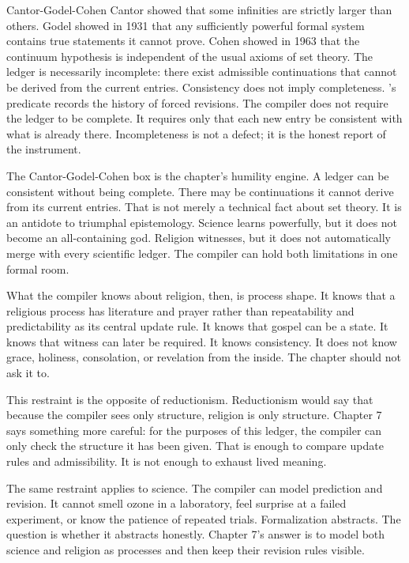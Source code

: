 \begin{gphenom}{Cantor-Godel-Cohen}
\label{ph:cantor-godel-cohen}
\GPhObs Cantor showed that some infinities are strictly larger than others.
Godel showed in 1931 that any sufficiently powerful formal system contains
true statements it cannot prove. Cohen showed in 1963 that the continuum
hypothesis is independent of the usual axioms of set theory.
\GPhCon The ledger is necessarily incomplete: there exist admissible
continuations that cannot be derived from the current entries. Consistency does
not imply completeness.
\GPhSeq {}'s  predicate records the history of forced
revisions. The compiler does not require the ledger to be complete. It requires
only that each new entry be consistent with what is already there.
Incompleteness is not a defect; it is the honest report of the instrument.
\end{gphenom}

The Cantor-Godel-Cohen box is the chapter's humility engine. A ledger can be
consistent without being complete. There may be continuations it cannot derive
from its current entries. That is not merely a technical fact about set theory.
It is an antidote to triumphal epistemology. Science learns powerfully, but it
does not become an all-containing god. Religion witnesses, but it does not
automatically merge with every scientific ledger. The compiler can hold both
limitations in one formal room.

What the compiler knows about religion, then, is process shape. It knows that a
religious process has literature and prayer rather than repeatability and
predictability as its central update rule. It knows that gospel can be a state.
It knows that witness can later be required. It knows consistency. It does not
know grace, holiness, consolation, or revelation from the inside. The chapter
should not ask it to.

This restraint is the opposite of reductionism. Reductionism would say that
because the compiler sees only structure, religion is only structure. Chapter 7
says something more careful: for the purposes of this ledger, the compiler can
only check the structure it has been given. That is enough to compare update
rules and admissibility. It is not enough to exhaust lived meaning.

The same restraint applies to science. The compiler can model prediction and
revision. It cannot smell ozone in a laboratory, feel surprise at a failed
experiment, or know the patience of repeated trials. Formalization abstracts.
The question is whether it abstracts honestly. Chapter 7's answer is to model
both science and religion as processes and then keep their revision rules
visible.


